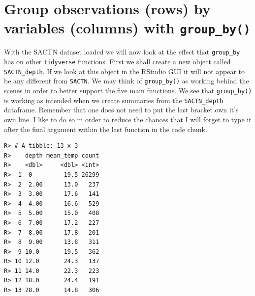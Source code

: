 \documentclass[]{book}
\newenvironment{Shaded}{\begin{snugshade}}{\end{snugshade}}
\newcommand{\KeywordTok}[1]{\textcolor[rgb]{0.13,0.29,0.53}{\textbf{#1}}}
\newcommand{\DataTypeTok}[1]{\textcolor[rgb]{0.13,0.29,0.53}{#1}}
\newcommand{\StringTok}[1]{\textcolor[rgb]{0.31,0.60,0.02}{#1}}
\newcommand{\CommentTok}[1]{\textcolor[rgb]{0.56,0.35,0.01}{\textit{#1}}}
\newcommand{\OtherTok}[1]{\textcolor[rgb]{0.56,0.35,0.01}{#1}}
\newcommand{\OperatorTok}[1]{\textcolor[rgb]{0.81,0.36,0.00}{\textbf{#1}}}
\newcommand{\NormalTok}[1]{#1}
\theoremstyle{definition}
\theoremstyle{definition}
\theoremstyle{definition}
\theoremstyle{remark}
\begin{document}
\section{\texorpdfstring{Group observations (rows) by variables
(columns) with
\texttt{group\_by()}}{Group observations (rows) by variables (columns) with group\_by()}}\label{group-observations-rows-by-variables-columns-with-group_by}

With the SACTN dataset loaded we will now look at the effect that
\texttt{group\_by} has on other \texttt{tidyverse} functions. First we
shall create a new object called \texttt{SACTN\_depth}. If we look at
this object in the RStudio GUI it will not appear to be any different
from \texttt{SACTN}. We may think of \texttt{group\_by()} as working
behind the scenes in order to better support the five main functions. We
see that \texttt{group\_by()} is working as intended when we create
summaries from the \texttt{SACTN\_depth} dataframe. Remember that one
does not need to put the last bracket own it's own line. I like to do so
in order to reduce the chances that I will forget to type it after the
final argument within the last function in the code chunk.

\begin{Shaded}
\end{Shaded}

\begin{verbatim}
R> # A tibble: 13 x 3
R>    depth mean_temp count
R>    <dbl>     <dbl> <int>
R>  1  0         19.5 26299
R>  2  2.00      13.0   237
R>  3  3.00      17.6   141
R>  4  4.00      16.6   529
R>  5  5.00      15.0   408
R>  6  7.00      17.2   227
R>  7  8.00      17.8   201
R>  8  9.00      13.8   311
R>  9 10.0       19.5   362
R> 10 12.0       24.3   137
R> 11 14.0       22.3   223
R> 12 18.0       24.4   191
R> 13 28.0       14.8   306
\end{verbatim}
\end{document}
